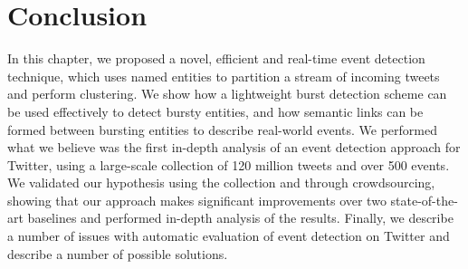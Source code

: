
\section{Conclusion}
In this chapter, we proposed a novel, efficient and real-time event detection technique, which uses named entities to partition a stream of incoming tweets and perform clustering.
We show how a lightweight burst detection scheme can be used effectively to detect bursty entities, and how semantic links can be formed between bursting entities to describe real-world events.
We performed what we believe was the first in-depth analysis of an event detection approach for Twitter, using a large-scale collection of 120 million tweets and over 500 events.
We validated our hypothesis using the collection and through crowdsourcing, showing that our approach makes significant improvements over two state-of-the-art baselines and performed in-depth analysis of the results.
Finally, we describe a number of issues with automatic evaluation of event detection on Twitter and describe a number of possible solutions.
